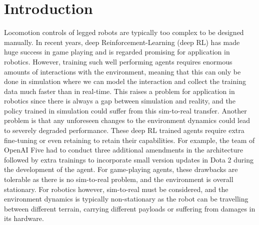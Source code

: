 \documentclass[journal]{IEEEtran}
\begin{document}
\section{Introduction}
Locomotion controls of legged robots are typically too complex to be designed manually.
In recent years, deep Reinforcement-Learning (deep RL) has made huge success in game playing
\cite{alphaGo, alphaStar} and is regarded promising for application in robotics. However, training such well performing agents requires enormous amounts of interactions with the environment, meaning that this can only 
be done in simulation where we can model the interaction and collect the training data much faster than in real-time. This raises a problem for application in robotics since there is always a gap between simulation and reality, and the policy trained in simulation could suffer from this sim-to-real transfer. Another problem is that any unforeseen changes to the environment dynamics could lead to severely degraded performance. These deep RL trained agents require extra fine-tuning or even retaining to retain their capabilities.
For example, the team of OpenAI Five \cite{openAI5} had to conduct three additional amendments in the architecture followed by extra trainings to incorporate small version updates in Dota 2 during the development of the agent.
For game-playing agents, these drawbacks are tolerable as there is no sim-to-real problem, and the environment is overall stationary. For robotics however, sim-to-real must be considered, and the environment dynamics is typically non-stationary as the robot can be travelling between different terrain, carrying different payloads or suffering from damages in its hardware.
\end{document}
